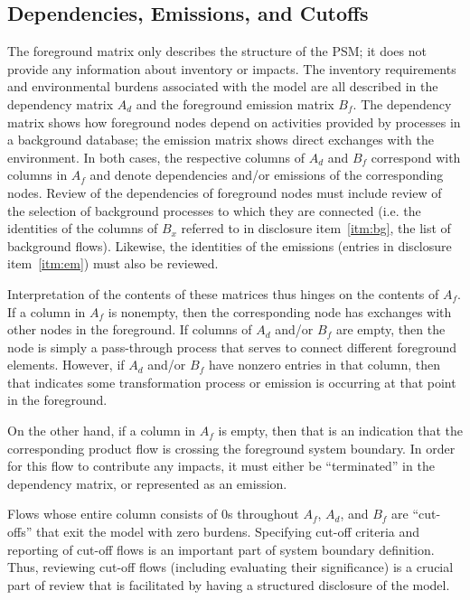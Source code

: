 \subsection{Dependencies, Emissions, and Cutoffs}

The foreground matrix only describes the structure of the PSM; it does not provide any information about inventory or impacts.  The inventory requirements and environmental burdens associated with the model are all described in the dependency matrix $A_d$ and the foreground emission matrix $B_f$.  The dependency matrix shows how foreground nodes depend on activities provided by processes in a background database; the emission matrix shows direct exchanges with the environment.  In both cases, the respective columns of $A_d$ and $B_f$ correspond with columns in $A_f$ and denote dependencies and/or emissions of the corresponding nodes.  Review of the dependencies of foreground nodes must include review of the selection of background processes to which they are connected (i.e. the identities of the columns of $B_x$ referred to in disclosure item~\ref{itm:bg}, the list of background flows). Likewise, the identities of the emissions (entries in disclosure item~\ref{itm:em}) must also be reviewed.

Interpretation of the contents of these matrices thus hinges on the contents of $A_f$.  If a column in $A_f$ is nonempty, then the corresponding node has exchanges with other nodes in the foreground.  If columns of $A_d$ and/or $B_f$ are empty, then the node is simply a pass-through process that serves to connect different foreground elements.  However, if $A_d$ and/or $B_f$ have nonzero entries in that column, then that indicates some transformation process or emission is occurring at that point in the foreground.  

On the other hand, if a column in $A_f$ is empty, then that is an indication that the corresponding product flow is crossing the foreground system boundary.  In order for this flow to contribute any impacts, it must either be ``terminated'' in the dependency matrix, or represented as an emission.  

Flows whose entire column consists of 0s throughout $A_f$, $A_d$, and $B_f$ are ``cut-offs'' that exit the model with zero burdens.  Specifying cut-off criteria and reporting of cut-off flows is an important part of system boundary definition.  Thus, reviewing cut-off flows (including evaluating their significance) is a crucial part of review that is facilitated by having a structured disclosure of the model.
